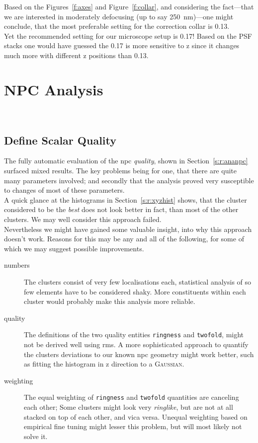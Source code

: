 \documentclass[11pt, a4paper, oneside, twocolumn]{report}
\renewcommand{\tt}{\texttt}
\newcommand{\e}{\emph}
\begin{document}
Based on the Figures~\ref{f:axes} and Figure~\ref{f:collar}, and
considering the fact---that we are interested in moderately defocusing
(up to say 250~nm)---one might conclude, that the most preferable
setting for the correction collar is 0.13.\\

Yet the recommended setting for our microscope setup is 0.17! Based on
the PSF stacks one would have guessed the 0.17 is more sensitive to z
since it changes much more with different z positions than 0.13.


\section{NPC Analysis}~\label{s:d:ananpc}


\subsection{Define Scalar Quality}

The fully automatic evaluation of the \gls{npc} \e{quality}, shown in
Section~\ref{s:r:ananpc} surfaced mixed results. The key problems
being for one, that there are quite many parameters involved; and
secondly that the analysis proved very susceptible to changes of most
of these parameters.\\

A quick glance at the histograms in Section~\ref{s:r:xyzhist} shows,
that the cluster considered to be the \e{best} does not look better in
fact, than most of the other clusters. We may well consider this
approach failed.\\

Nevertheless we might have gained some valuable insight, into why this
approach doesn't work. Reasons for this may be any and all of the
following, for some of which we may suggest possible improvements.

\begin{description}
\item [numbers] The clusters consist of very few localisations each,
  statistical analysis of so few elements have to be considered
  shaky. More constituents within each cluster would probably make
  this analysis more reliable.
\item [quality] The definitions of the two quality entities
  \tt{ringness} and \tt{twofold}, might not be derived well using
  \gls{rms}. A more sophisticated approach to quantify the clusters
  deviations to our known \gls{npc} geometry might work better, such
  as fitting the histogram in z direction to a \textsc{Gaussian}.
\item [weighting] The equal weighting of \tt{ringness} and
  \tt{twofold} quantities are canceling each other; Some clusters
  might look very \e{ringlike}, but are not at all stacked on top of
  each other, and vica versa. Unequal weighting based on empirical
  fine tuning might lesser this problem, but will most likely not
  solve it.
\end{description}
\end{document}
